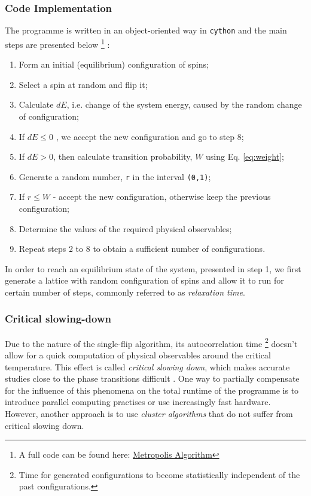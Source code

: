 \subsubsection*{Code Implementation}

The programme is written in an object-oriented way in \verb+cython+ and the main steps are presented below \footnote{A full code can be found here: \href{https://github.com/artemstopnevich/Ising_Model_2D/blob/689a1759fd7a9aaacc71fcb317da944f78cce749/Metropolis/}{Metropolis Algorithm} }
:

\begin{enumerate}
	\item Form an initial (equilibrium) configuration of spins;
	\item Select a spin at random and flip it;
	\item Calculate $dE$, i.e. change of the  system energy, caused by the random change of configuration;
	\item If $dE \leq 0$ , we accept the new configuration and go to step 8;
	\item If $dE > 0$, then calculate transition probability, $W$ using Eq. \ref{eq:weight};
	\item Generate a random number, \verb+r+ in the interval \verb+(0,1)+;
	\item If $r \leq W$ - accept the new configuration, otherwise keep the previous configuration;
	\item Determine the values of the required physical observables;
	\item Repeat steps 2 to 8 to obtain a sufficient number of configurations.
\end{enumerate}

In order to reach an equilibrium state of the system, presented in step 1, we first generate a lattice with random configuration of spins and allow it to run for certain number of steps, commonly referred to as \textit{relaxation time}. 

\subsubsection*{Critical slowing-down}

Due to the nature of the single-flip algorithm, its autocorrelation time
\footnote{Time for generated configurations to become statistically independent of the past configurations.}
doesn't allow for a quick computation of physical observables around the critical temperature. This effect is called \textit{critical slowing down}, which makes accurate studies close to the phase transitions difficult \cite{sandvik}. One way to partially compensate for the influence of this phenomena on the total runtime of the programme is to introduce parallel computing practises or use increasingly fast hardware. However, another approach is to use \textit{cluster algorithms} that do not suffer from critical slowing down.

